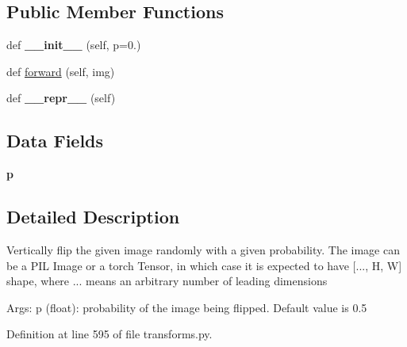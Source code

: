 \subsection*{Public Member Functions}
\begin{DoxyCompactItemize}
\item 
\mbox{\label{classtorchvision_1_1transforms_1_1transforms_1_1RandomVerticalFlip_aba12663f293d38a4cf463fa402120e52}} 
def {\bfseries \+\_\+\+\_\+init\+\_\+\+\_\+} (self, p=0.)
\item 
def \hyperlink{classtorchvision_1_1transforms_1_1transforms_1_1RandomVerticalFlip_ad1a03725ddc2f109fdd1064cc11a4d35}{forward} (self, img)
\item 
\mbox{\label{classtorchvision_1_1transforms_1_1transforms_1_1RandomVerticalFlip_a6eac2aa81d6b5970cefc09209f232853}} 
def {\bfseries \+\_\+\+\_\+repr\+\_\+\+\_\+} (self)
\end{DoxyCompactItemize}
\subsection*{Data Fields}
\begin{DoxyCompactItemize}
\item 
\mbox{\label{classtorchvision_1_1transforms_1_1transforms_1_1RandomVerticalFlip_a707145d67fb3b80660ced73ea1417f75}} 
{\bfseries p}
\end{DoxyCompactItemize}


\subsection{Detailed Description}
\begin{DoxyVerb}Vertically flip the given image randomly with a given probability.
The image can be a PIL Image or a torch Tensor, in which case it is expected
to have [..., H, W] shape, where ... means an arbitrary number of leading
dimensions

Args:
    p (float): probability of the image being flipped. Default value is 0.5
\end{DoxyVerb}
 

Definition at line 595 of file transforms.\+py.




